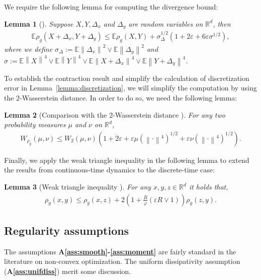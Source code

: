 \documentclass{article}
\newcommand{\norm}[1]{\left\lVert#1\right\rVert} %
\newtheorem{lemma}{Lemma}
\begin{document}
We require the following lemma for computing the divergence bound:
\begin{lemma}[{\citep[Lemma D.3]{Farghly}}]\label{D.3 Farghly}
	Suppose $X, Y, \Delta_x$ and $\Delta_y$ are random variables on $\mathbb{R}^d$, then
	\begin{align*}
		\mathbb{E} \rho_g(X+\Delta_x, Y + \Delta_y) \leq \mathbb{E}\rho_g(X, Y) + \sigma_\Delta^{1/2} (1 +2\varepsilon + 6\varepsilon\sigma^{1/2}),
	\end{align*}
	where we define $\sigma_\Delta := \mathbb{E} \norm{\Delta_x}^2 \vee \mathbb{E}\norm{\Delta_y}^2$ and $\sigma := \mathbb{E} \norm{X}^4 \vee \mathbb{E} \norm{Y}^4 \vee \mathbb{E} \norm{X+\Delta_x}^4 \vee \mathbb{E} \norm{Y+\Delta_y}^4$.
\end{lemma}

To establish the contraction result and simplify the calculation of discretization error in Lemma~\ref{lemma:discretization}, we will simplify the computation by using the 2-Wasserstein distance. In order to do so, we need the following lemma:

\begin{lemma}
	[Comparison with the 2-Wasserstein distance {\citep[Lemma D.2]{Farghly}}]\label{Lemma D.2}
	For any two probability measures $\mu$ and $\nu$ on $\mathbb{R}^d$,
	\begin{align*}
		W_{\rho_g} (\mu, \nu) \leq W_2 (\mu, \nu) (1+2\varepsilon + \varepsilon\mu(\norm{\cdot}^4)^{1/2} + \varepsilon\nu(\norm{\cdot}^4)^{1/2}).
	\end{align*}
\end{lemma}

Finally, we apply the weak triangle inequality in the following lemma to extend the results from continuous-time dynamics to the discrete-time case:
\begin{lemma}
	[Weak triangle inequality {\citep[Lemma D.1]{Farghly}}]\label{Lemma D.1}
	For any $x, y, z \in \mathbb{R}^d$ it holds that,
	\begin{align*}
		\rho_g(x, y) \leq \rho_g(x,z) + 2 \left(1+ \frac{R}{\varphi} (\varepsilon R \vee 1) \right) \rho_g(z, y).
	\end{align*}
\end{lemma}

\subsection{Regularity assumptions}

The assumptions \textbf{A\ref{ass:smooth}-\ref{ass:moment}} are fairly standard in the literature on non-convex optimization. The uniform dissipativity assumption (\textbf{A\ref{ass:unifdiss}}) merit some discussion.
\end{document}

